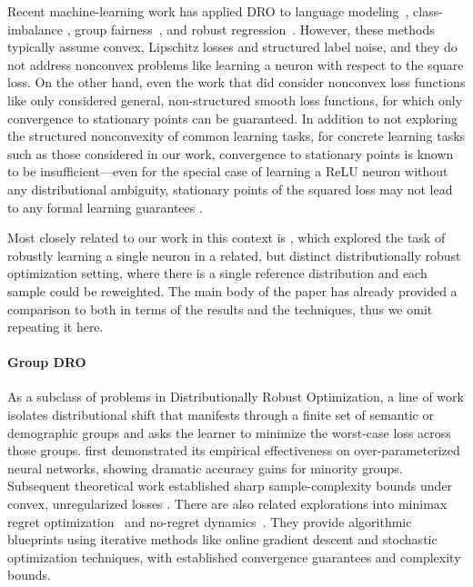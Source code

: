 \documentclass[11pt]{article}
\newcounter{thm}
\numberwithin{thm}{section}
\theoremstyle{plain}
\theoremstyle{definition}
\theoremstyle{remark} \newtheorem{remark}[thm]{Remark}
\begin{document}
Recent machine-learning work has applied DRO to language modeling~\citep{oren2019distributionally}, class-imbalance \allowbreak\citep{xu2020class}, group fairness~\citep{hashimoto2018fairness}, and robust regression~\citep{blanchet2021statistical,duchi2021learning,chen2018robust}. However, these methods typically assume convex, Lipschitz losses and structured label noise, and they do not address nonconvex problems like learning a neuron with respect to the square loss. On the other hand, even the work that did consider nonconvex loss functions like \citep{qi2021online,sinha2018certifying} only considered general, non-structured smooth loss functions, for which only convergence to stationary points can be guaranteed. In addition to  not exploring the structured nonconvexity of common learning tasks, for concrete learning tasks such as those considered in our work, convergence to stationary points is known to be insufficient---even for the special case of learning a ReLU neuron without any distributional ambiguity, stationary points of the squared loss may not lead to any formal learning guarantees \citep{yehudai2020learning}. 


Most closely related to our work in this context is \citep{Li2024shifts}, which  explored the task of robustly learning a single neuron in a related, but distinct distributionally robust optimization setting, where there is a single reference distribution and each sample could be reweighted. The main body of the paper has already provided a comparison to \citep{Li2024shifts} both in terms of the results and the techniques, thus we omit repeating it here. 

\paragraph{Group DRO}
As a subclass of problems in Distributionally Robust Optimization, a line of work isolates distributional shift that manifests through a finite set of semantic or demographic groups and asks the learner to minimize the worst-case loss across those groups. \citep{sagawa2020groupDRO} first demonstrated its empirical effectiveness on over-parameterized neural networks, showing dramatic accuracy gains for minority groups. Subsequent theoretical work established sharp sample-complexity bounds under convex, unregularized losses \citep{haghtalab2022ondemand,soma2022optimal,Zhang2023Stochastic}. There are also related explorations into minimax regret optimization~\citep{agarwal2022minimax} and no-regret dynamics~\citep{wang2024fenchel}. They provide algorithmic blueprints using iterative methods like online gradient descent and stochastic optimization techniques, with established convergence guarantees and complexity bounds.
\end{document}

